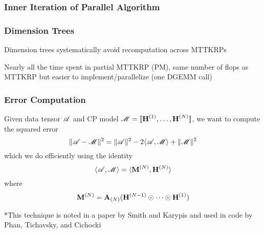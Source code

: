 \documentclass[xcolor=dvipsnames]{beamer}
\begin{document}
\begin{frame}
\frametitle{Inner Iteration of Parallel Algorithm}

\begin{figure}
\centering
  \subfloat[Start]{} \quad
   \quad
   \quad
   \quad
\end{figure}
\end{frame}

\begin{frame}
\frametitle{Dimension Trees}

\begin{center}
\footnotesize
Dimension trees systematically avoid recomputation across MTTKRPs 
\normalsize

\vfill


\end{center}

\vfill

\footnotesize
Nearly all the time spent in partial MTTKRP (PM), same number of flops as MTTKRP but easier to implement/parallelize (one DGEMM call)
\normalsize

\end{frame}

\begin{frame}
\frametitle{Error Computation}

Given data tensor $\TA$ and CP model $\T{M} = \CP$, we want to compute the squared error
$$\| \TA - \T{M}\|^2 = \|\TA\|^2 - 2\langle \TA, \T{M} \rangle + \|\T{M}\|^2$$
which we do efficiently using the identity
$$\langle \TA, \T{M} \rangle = \langle \Mn{M}{N}, \Mn{H}{N} \rangle$$ 
where 
$$\Mn{M}{N} = \Mz{A}{N} (\Mn{H}{N-1} \Khat \cdots \Khat \Mn{H}{1})$$

\vfill

*This technique is noted in a paper by Smith and Karypis and used in code by Phan, Tichavsky, and Cichocki

\end{frame}
\end{document}
